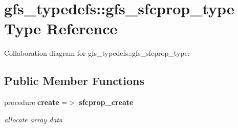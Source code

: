 \section{gfs\+\_\+typedefs\+:\+:gfs\+\_\+sfcprop\+\_\+type Type Reference}
\label{structgfs__typedefs_1_1gfs__sfcprop__type}


Collaboration diagram for gfs\+\_\+typedefs\+:\+:gfs\+\_\+sfcprop\+\_\+type\+:
\subsection*{Public Member Functions}
\begin{DoxyCompactItemize}
\item 
procedure \textbf{ create} =$>$ \textbf{ sfcprop\+\_\+create}
\begin{DoxyCompactList}\small\item\em allocate array data \end{DoxyCompactList}\end{DoxyCompactItemize}
